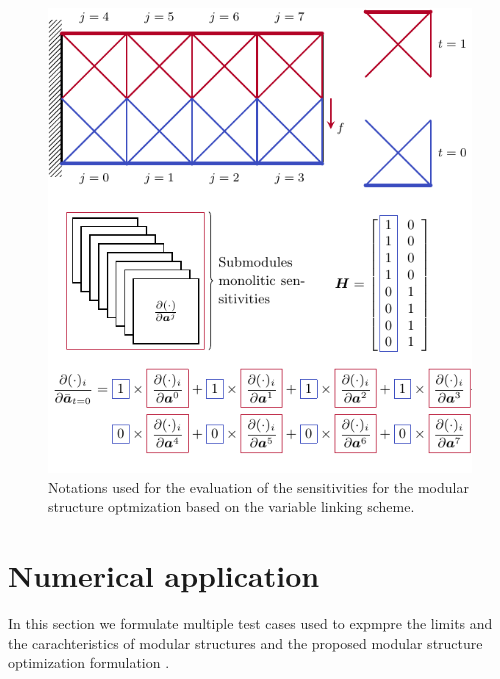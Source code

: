 \begin{figure}
    \centering
    \includegraphics{figures/05_cellular_opt/00_modules_VL_grad/modules_grad.pdf}
    \caption{Notations used for the evaluation of the sensitivities for the modular structure optmization based on the variable linking scheme.}
    \label{fig:05_VL_grad}
\end{figure}

\section{Numerical application}
In this section we formulate multiple test cases used to expmpre the limits and the carachteristics of modular structures and the proposed modular structure optimization formulation .

